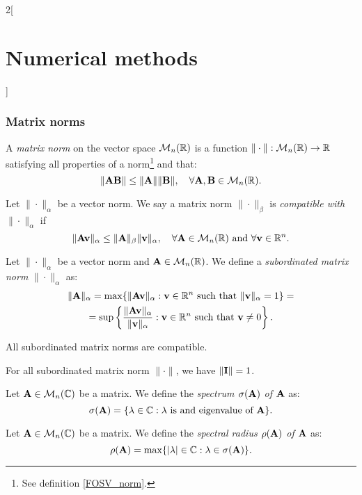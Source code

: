 \documentclass[../../../main.tex]{subfiles}
\begin{document}
\begin{multicols}{2}[\section{Numerical methods}]
\subsubsection*{Matrix norms}
\begin{definition}
    A \textit{matrix norm} on the vector space $\mathcal{M}_n(\mathbb{R})$ is a function $\|\cdot\|:\mathcal{M}_n(\mathbb{R})\rightarrow\mathbb{R}$ satisfying all properties of a norm\footnote{See definition \ref{FOSV_norm}.} and that: $$\|\vb{A}\vb{B}\|\leq\|\vb{A}\|\|\vb{B}\|,\quad\forall \vb{A},\vb{B}\in\mathcal{M}_n(\mathbb{R}).$$
\end{definition}
\begin{definition}
    Let $\|\cdot\|_\alpha$ be a vector norm. We say a matrix norm $\|\cdot\|_\beta$ is \textit{compatible with $\|\cdot\|_\alpha$} if $$\|\vb{A}\vb{v}\|_\alpha\leq\|\vb{A}\|_\beta\|\vb{v}\|_\alpha,\quad\forall\vb{A}\in\mathcal{M}_n(\mathbb{R})\text{ and }\forall\vb{v}\in\mathbb{R}^n.$$
\end{definition}
\begin{definition}
    Let $\|\cdot\|_\alpha$ be a vector norm and $\vb{A}\in\mathcal{M}_n(\mathbb{R})$. We define a \textit{subordinated matrix norm} $\|\cdot\|_\alpha$ as:
    \begin{multline*}
        \|\vb{A}\|_\alpha=\max\{\|\vb{A}\vb{v}\|_\alpha:\vb{v}\in\mathbb{R}^n\text{ such that }\|\vb{v}\|_\alpha=1\}=\\=\sup\left\{\frac{\|\vb{A}\vb{v}\|_\alpha}{\|\vb{v}\|_\alpha}:\vb{v}\in\mathbb{R}^n\text{ such that }\vb{v}\ne 0\right\}.
    \end{multline*}
\end{definition}
\begin{lemma}
    All subordinated matrix norms are compatible.
\end{lemma}
\begin{lemma}
    For all subordinated matrix norm $\|\cdot\|$, we have $\|\vb{I}\|=1$.
\end{lemma}
\begin{definition}
    Let $\vb{A}\in\mathcal{M}_n(\mathbb{C})$ be a matrix. We define the \textit{spectrum $\sigma(\vb{A})$ of $\vb{A}$} as: $$\sigma(\vb{A})=\{\lambda\in\mathbb{C}:\lambda\text{ is and eigenvalue of }\vb{A}\}.$$
\end{definition}
\begin{definition}
    Let $\vb{A}\in\mathcal{M}_n(\mathbb{C})$ be a matrix. We define the \textit{spectral radius $\rho(\vb{A})$ of $\vb{A}$} as: $$\rho(\vb{A})=\max\{|\lambda|\in\mathbb{C}:\lambda\in\sigma(\vb{A})\}.$$

\end{definition}
\end{multicols}
\end{document}
